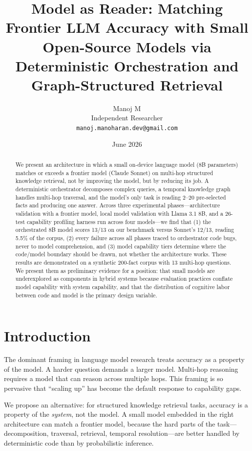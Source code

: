 \documentclass[11pt,a4paper]{article}
\title{Model as Reader: Matching Frontier LLM Accuracy with Small Open-Source Models via Deterministic Orchestration and Graph-Structured Retrieval}
\author{Manoj M\\Independent Researcher\\\texttt{manoj.manoharan.dev@gmail.com}}
\date{June 2026}
\begin{document}
\maketitle

\begin{abstract}
We present an architecture in which a small on-device language model (8B parameters) matches or exceeds a frontier model (Claude Sonnet) on multi-hop structured knowledge retrieval, not by improving the model, but by reducing its job. A deterministic orchestrator decomposes complex queries, a temporal knowledge graph handles multi-hop traversal, and the model's only task is reading 2--20 pre-selected facts and producing one answer. Across three experimental phases---architecture validation with a frontier model, local model validation with Llama 3.1 8B, and a 26-test capability profiling harness run across four models---we find that (1) the orchestrated 8B model scores 13/13 on our benchmark versus Sonnet's 12/13, reading 5.5\% of the corpus, (2) every failure across all phases traced to orchestrator code bugs, never to model comprehension, and (3) model capability tiers determine where the code/model boundary should be drawn, not whether the architecture works. These results are demonstrated on a synthetic 200-fact corpus with 13 multi-hop questions. We present them as preliminary evidence for a position: that small models are underexplored as components in hybrid systems because evaluation practices conflate model capability with system capability, and that the distribution of cognitive labor between code and model is the primary design variable.
\end{abstract}

\section{Introduction}
\label{sec:intro}

The dominant framing in language model research treats accuracy as a property of the model. A harder question demands a larger model. Multi-hop reasoning requires a model that can reason across multiple hops. This framing is so pervasive that ``scaling up'' has become the default response to capability gaps.

We propose an alternative: for structured knowledge retrieval tasks, accuracy is a property of the \emph{system}, not the model. A small model embedded in the right architecture can match a frontier model, because the hard parts of the task---decomposition, traversal, retrieval, temporal resolution---are better handled by deterministic code than by probabilistic inference.
\end{document}
